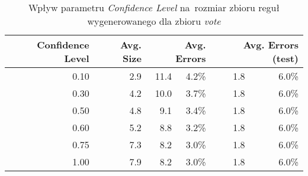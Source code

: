 \begin{table}
\begin{tabular}{|r|r|rr|rr|}
\hline
 Confidence Level & 
 Avg. Size & 
 \multicolumn{2}{1|}{Avg. Errors} & 
 \multicolumn{2}{1|}{Avg. Errors (test)} \\
\hline\hline
      0.10 &    2.9 &   11.4 & 4.2\% &    1.8 &  6.0\% \\
      0.30 &    4.2 &   10.0 & 3.7\% &    1.8 &  6.0\% \\
      0.50 &    4.8 &    9.1 & 3.4\% &    1.8 &  6.0\% \\
      0.60 &    5.2 &    8.8 & 3.2\% &    1.8 &  6.0\% \\      
      0.75 &    7.3 &    8.2 & 3.0\% &    1.8 &  6.0\% \\
      1.00 &    7.9 &    8.2 & 3.0\% &    1.8 &  6.0\% \\
\hline
\end{tabular}
\caption{Wpływ parametru \emph{Confidence Level} na~rozmiar zbioru reguł wygenerowanego dla zbioru \emph{vote}}
\label{p2t2-vote-confidence-level}
\end{table}
